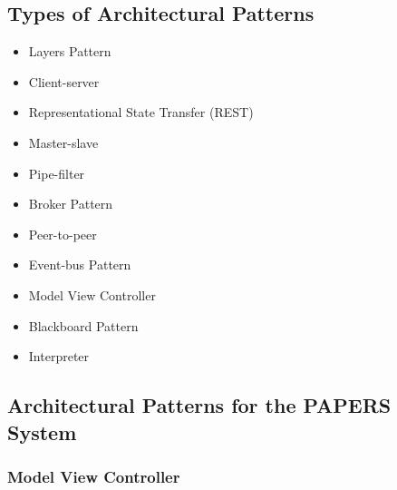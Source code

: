 \documentclass[a4paper,12pt]{article}
\begin{document}
\subsection{Types of Architectural Patterns}

\begin{itemize}
\item Layers Pattern
\item Client-server
\item Representational State Transfer (REST)
\item Master-slave
\item Pipe-filter
\item Broker Pattern
\item Peer-to-peer
\item Event-bus Pattern
\item Model View Controller
\item Blackboard Pattern
\item Interpreter
\end{itemize}

\subsection{Architectural Patterns for the PAPERS System}
\subsubsection{Model View Controller}
\end{document}
